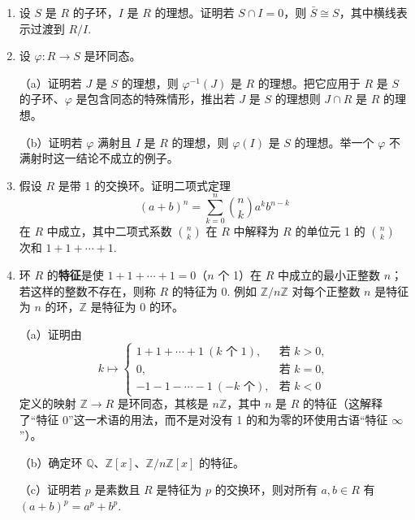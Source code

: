 \begin{enumerate}
（a）证明 \(\{x \in R \mid ax = 0\}\) 是右理想，\(\{y \in R \mid ya = 0\}\) 是左理想（分别称为 \(a\) 在 \(R\) 中的右、左\textbf{零化子}）。

（b）证明若 \(L\) 是 \(R\) 的左理想，则 \(\{x \in R \mid xa = 0 \text{ 对所有 } a \in L\}\) 是双边理想（称为 \(L\) 在 \(R\) 中的左零化子）。

\item 设 \(S\) 是 \(R\) 的子环，\(I\) 是 \(R\) 的理想。证明若 \(S \cap I = 0\)，则 \(\bar{S} \cong S\)，其中横线表示过渡到 \(R/I\).

\item 设 \(\varphi : R \to S\) 是环同态。

（a）证明若 \(J\) 是 \(S\) 的理想，则 \(\varphi^{-1}(J)\) 是 \(R\) 的理想。把它应用于 \(R\) 是 \(S\) 的子环、\(\varphi\) 是包含同态的特殊情形，推出若 \(J\) 是 \(S\) 的理想则 \(J \cap R\) 是 \(R\) 的理想。

（b）证明若 \(\varphi\) 满射且 \(I\) 是 \(R\) 的理想，则 \(\varphi(I)\) 是 \(S\) 的理想。举一个 \(\varphi\) 不满射时这一结论不成立的例子。

\item 假设 \(R\) 是带 1 的交换环。证明二项式定理
\[
(a+b)^n = \sum_{k=0}^{n}\binom{n}{k}a^kb^{n-k}
\]
在 \(R\) 中成立，其中二项式系数 \(\binom{n}{k}\) 在 \(R\) 中解释为 \(R\) 的单位元 1 的 \(\binom{n}{k}\) 次和 \(1+1+\cdots+1\).

\item 环 \(R\) 的\textbf{特征}是使 \(1+1+\cdots+1 = 0\)（\(n\) 个 1）在 \(R\) 中成立的最小正整数 \(n\)；若这样的整数不存在，则称 \(R\) 的特征为 0. 例如 \(\mathbb{Z}/n\mathbb{Z}\) 对每个正整数 \(n\) 是特征为 \(n\) 的环，\(\mathbb{Z}\) 是特征为 0 的环。

（a）证明由
\[
k \mapsto \begin{cases} 1+1+\cdots+1\ (k \text{ 个 } 1), & \text{若 } k > 0, \\ 0, & \text{若 } k = 0, \\ -1-1-\cdots-1\ (-k \text{ 个}), & \text{若 } k < 0 \end{cases}
\]
定义的映射 \(\mathbb{Z} \to R\) 是环同态，其核是 \(n\mathbb{Z}\)，其中 \(n\) 是 \(R\) 的特征（这解释了“特征 0”这一术语的用法，而不是对没有 1 的和为零的环使用古语“特征 \(\infty\)”）。

（b）确定环 \(\mathbb{Q}\)、\(\mathbb{Z}[x]\)、\(\mathbb{Z}/n\mathbb{Z}[x]\) 的特征。

（c）证明若 \(p\) 是素数且 \(R\) 是特征为 \(p\) 的交换环，则对所有 \(a, b \in R\) 有 \((a+b)^p = a^p+b^p\).


\end{enumerate}
